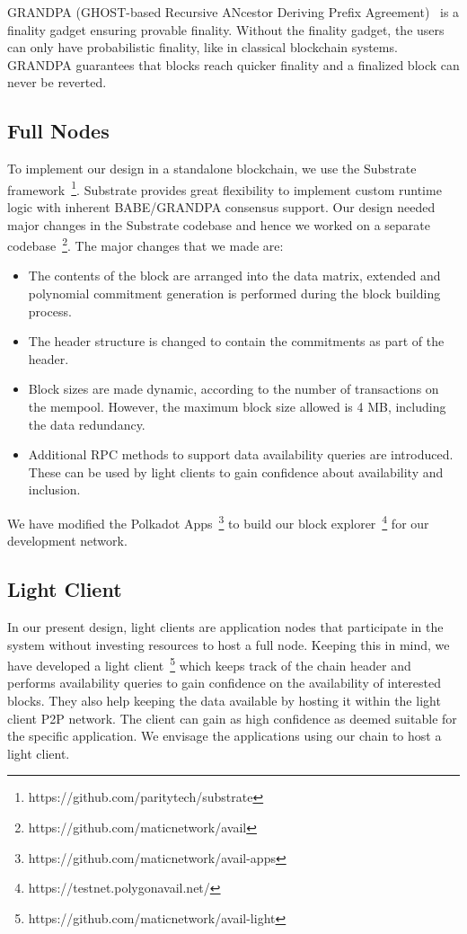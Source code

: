 \documentclass[sigconf, screen=true, nonacm]{acmart}
\begin{document}
        GRANDPA (GHOST-based Recursive ANcestor Deriving Prefix Agreement)~\cite{grandpa} is a finality gadget ensuring provable finality. Without the finality gadget, the users can only have probabilistic finality, like in classical blockchain systems. GRANDPA guarantees that blocks reach quicker finality and a finalized block can never be reverted. 

    \subsection{Full Nodes}
        To implement our design in a standalone blockchain, we use the Substrate framework~\footnote{https://github.com/paritytech/substrate}. Substrate provides great flexibility to implement custom runtime logic with inherent BABE/GRANDPA consensus support. Our design needed major changes in the Substrate codebase and hence we worked on a separate codebase~\footnote{https://github.com/maticnetwork/avail}. The major changes that we made are:
        \begin{itemize}
            \item The contents of the block are arranged into the data matrix, extended and polynomial commitment generation is performed during the block building process. 
            \item The header structure is changed to contain the commitments as part of the header. 
            \item Block sizes are made dynamic, according to the number of transactions on the mempool. However, the maximum block size allowed is 4 MB, including the data redundancy.  
            \item Additional RPC methods to support data availability queries are introduced. These can be used by light clients to gain confidence about availability and inclusion.
        \end{itemize}
        We have modified the Polkadot Apps~\footnote{https://github.com/maticnetwork/avail-apps} to build our block explorer~\footnote{https://testnet.polygonavail.net/} for our development network. 

    \subsection{Light Client}
        In our present design, light clients are application nodes that participate in the system without investing resources to host a full node. Keeping this in mind, we have developed a light client~\footnote{https://github.com/maticnetwork/avail-light} which keeps track of the chain header and performs availability queries to gain confidence on the availability of interested blocks. They also help keeping the data available by hosting it within the light client P2P network. The client can gain as high confidence as deemed suitable for the specific application. We envisage the applications using our chain to host a light client.
\end{document}
